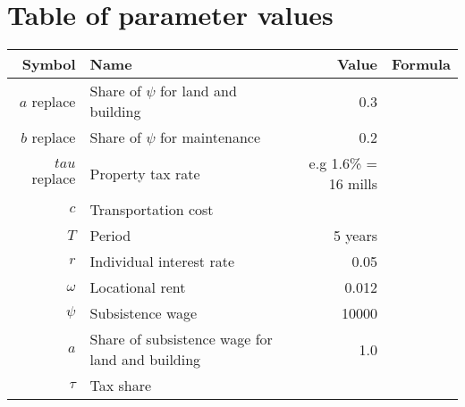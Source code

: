 \section{Table of parameter values}

\renewcommand{\arraystretch}{1.5}
\begin{tabular}{rlrr}
Symbol         & Name                                 & Value      & Formula  \\ \hline
$a$ replace    & Share of $\psi$ for land and building &   0.3         & \\
$b$ replace    & Share of $\psi$ for maintenance       &   0.2         & \\
$tau$ replace  & Property tax rate &  e.g 1.6\% = 16 mills             & \\
$c$       & Transportation cost & \\
$T$       & Period & 5 years      \\
$r$       & Individual interest rate & 0.05 \\
$\omega$  & Locational rent & 0.012  \\
$\psi$    & Subsistence wage & 10000 \\
$a$       & Share of subsistence wage for land and building & 1.0 \\
$\tau$       & Tax share & \\


\end{tabular}
